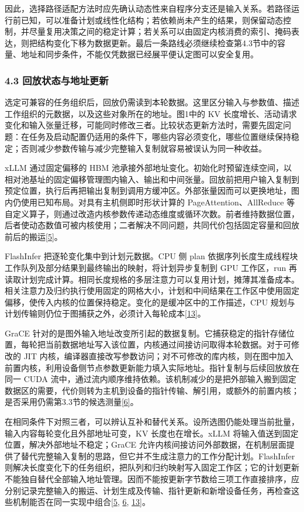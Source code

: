 \documentclass[UTF8,11pt,fontset=windows]{ctexart}
\begin{document}
因此，选择路径适配方法时应先确认动态性来自程序分支还是输入关系。若路径运行前已知，可以准备计划或线性化结构；若依赖尚未产生的结果，则保留动态控制，并尽量复用决策之间的稳定计算；若关系可以由固定内核消费的索引、掩码表达，则把结构变化下移为数据更新。最后一条路线必须继续检查第4.3节中的容量、地址和同步条件，不能仅凭数据已经展平便认定图可以安全复用。

\hypertarget{section-4-3}{%
\subsubsection{4.3 回放状态与地址更新}\label{section-4-3}}

选定可兼容的任务组织后，回放仍需读到本轮数据。这里区分输入与参数值、描述工作组织的元数据，以及这些对象所在的地址。图1中的 KV 长度增长、活动请求变化和输入张量迁移，可能同时修改三者。比较状态更新方法时，需要先固定问题：在任务及启动配置仍适用的条件下，哪些内容必须变化，哪些位置继续保持稳定；否则减少参数传输与减少完整输入复制就容易被误认为同一种收益。

xLLM 通过固定偏移的 HBM 池承接外部地址变化。初始化时预留连续空间，以相对池基址的固定偏移管理图内输入、输出和中间张量。回放前把用户输入复制到预定位置，执行后再把输出复制到调用方缓冲区。外部张量因而可以更换地址，图内仍使用已知布局。对具有主机侧即时形状计算的 PageAttention、AllReduce 等自定义算子，则通过改造内核参数传递动态维度或循环次数。前者维持数据位置，后者使动态数值可被内核使用；二者解决不同问题，共同代价包括固定容量和回放前后的搬运\protect\hyperlink{ref-5}{{[}5{]}}。

FlashInfer 把逐轮变化集中到计划元数据。CPU 侧 plan 依据序列长度生成线程块工作队列及部分结果到最终输出的映射，将计划异步复制到 GPU 工作区，run 再读取计划完成计算。相同长度规格的多层注意力可以复用计划，摊薄其准备成本。相关注意力及归约执行使用固定的网格大小，计划和中间结果在工作区中使用固定偏移，使传入内核的位置保持稳定。变化的是缓冲区中的工作描述，CPU 规划与计划传输则仍位于图捕获之外，必须计入每轮成本\protect\hyperlink{ref-13}{{[}13{]}}。

GraCE 针对的是图外输入地址改变所引起的数据复制。它捕获稳定的指针存储位置，每轮把当前数据地址写入该位置，内核通过间接访问取得本轮数据。对于可修改的 JIT 内核，编译器直接改写参数访问；对不可修改的库内核，则在图中加入前置内核，利用设备侧节点参数更新能力填入实际地址。指针复制与后续回放放在同一 CUDA 流中，通过流内顺序维持依赖。该机制减少的是把外部输入搬到固定数据区的需要，代价则转为主机到设备的指针传输、解引用，或额外的前置内核；是否采用仍需第3.3节的候选测量\protect\hyperlink{ref-6}{{[}6{]}}。

在相同条件下对照三者，可以辨认互补和替代关系。设所选图仍能处理当前批量，输入内容每轮变化且外部地址可变，KV 长度也在增长。xLLM 将输入值送到固定位置，解决外部地址不稳定；GraCE 允许内核间接访问外部数据，在机制层面提供了替代完整输入复制的思路，但它并不生成注意力的工作分配计划。FlashInfer 则解决长度变化下的任务组织，把队列和归约映射写入固定工作区；它的计划更新不能独自替代全部输入地址管理。因而不能按更新字节数给三项工作直接排序，应分别记录完整输入的搬运、计划生成及传输、指针更新和新增设备任务，再检查这些机制能否在同一实现中组合\protect\hyperlink{ref-5}{{[}5}, \protect\hyperlink{ref-6}{6}, \protect\hyperlink{ref-13}{13{]}}。
\end{document}
